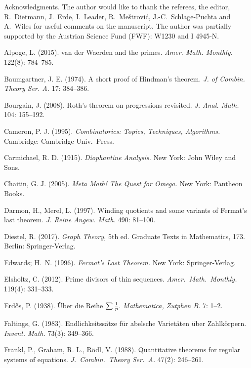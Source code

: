 \documentclass[12pt]{article}
\theoremstyle{theorem}
\theoremstyle{definition}
\begin{document}
\begin{acknowledgment}{Acknowledgments.}
The author would like to thank the referees, the editor,
R.~Dietmann, 
J.~Erde, I.~Leader, R.~Me\v{s}trovi\'{c},
J.-C.~Schlage-Puchta and A.~Wiles
for useful comments on the manuscript.
The author was partially supported by the Austrian Science Fund (FWF): W1230
and I 4945-N.
\end{acknowledgment}
\begin{thebibliography}{99}
Alpoge, L. (2015).
van der Waerden and the primes. \textit{Amer. Math. Monthly.} 122(8): 784--785.

Baumgartner, J. E. (1974).
A short proof of Hindman's theorem. 
\textit{J. of Combin. Theory Ser. A.} 17: 384--386.

Bourgain, J. (2008).
Roth's theorem on progressions revisited.
\textit{J. Anal. Math.} 104: 155--192. 


Cameron, P. J. (1995).
\textit{Combinatorics: Topics, Techniques, Algorithms.} 
Cambridge: Cambridge Univ.~Press.

Carmichael, R. D. (1915).
\textit{Diophantine Analysis.}
New York: John Wiley and Sons.

Chaitin, G. J. (2005).
\textit{Meta Math! The Quest for Omega.}
New York: Pantheon Books.

Darmon, H., Merel, L. (1997).
Winding quotients and some variants of Fermat's last theorem.
\textit{ J. Reine Angew. Math.} 490: 81--100. 

Diestel, R. (2017). \textit{Graph Theory,}
5th ed. Graduate Texts in Mathematics, 173. Berlin: Springer-Verlag.



Edwards; H.~N. (1996).
\textit{Fermat's Last Theorem.}
New York: Springer-Verlag.

Elsholtz, C. (2012).
Prime divisors of thin sequences. \textit{Amer.~Math.~Monthly.} 119(4): 331--333.

Erd\H{o}s, P. (1938).
\"Uber die Reihe $\sum {1 \over p}$. 
\textit{Mathematica, Zutphen B.} 7: 1--2.

Faltings, G. (1983).
Endlichkeitss\"{a}tze f\"ur abelsche Variet\"aten \"uber Zahlk\"orpern.
\textit{Invent. Math.} 73(3): 349--366. 

Frankl, P., Graham, R. L., R\"odl, V. (1988). 
Quantitative theorems for regular systems of equations. 
\textit{J.~Combin.~Theory Ser.~A.} 47(2): 246--261. 


\end{thebibliography}
\end{document}
